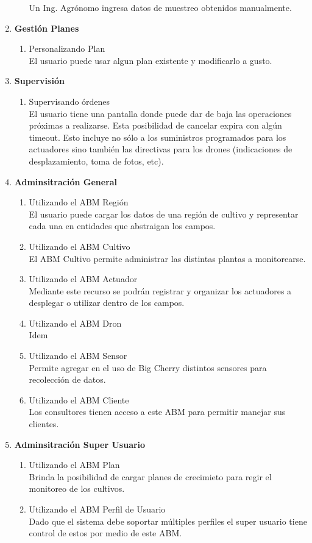\begin{enumerate}
\begin{enumerate}
   Un Ing. Agr\'onomo ingresa datos de muestreo obtenidos manualmente.
\end{enumerate}
 \item \textbf{Gesti\'on Planes}
 \begin{enumerate}
    \item Personalizando Plan\\
	El usuario puede usar algun plan existente y modificarlo a gusto.
 \end{enumerate}
 \item \textbf{Supervisión}
 \begin{enumerate}
  \item Supervisando órdenes\\
  El usuario tiene una pantalla donde puede dar de baja las operaciones próximas a realizarse. Esta posibilidad de cancelar expira con algún timeout. Esto incluye no sólo a los suministros programados para los actuadores sino también las directivas para los drones (indicaciones de desplazamiento, toma de fotos, etc).
 \end{enumerate} 
 \item \textbf{Adminsitraci\'on General}
 \begin{enumerate}
    \item Utilizando el ABM Región\\
	El usuario puede cargar los datos de una región de cultivo y representar cada una en entidades que abstraigan los campos.
    \item Utilizando el ABM Cultivo\\
	El ABM Cultivo permite administrar las distintas plantas a monitorearse.
    \item Utilizando el ABM Actuador\\
    Mediante este recurso se podrán registrar y organizar los actuadores a desplegar o utilizar dentro de los campos.
    \item Utilizando el ABM Dron\\
    Idem
    \item Utilizando el ABM Sensor\\
    Permite agregar en el uso de Big Cherry distintos sensores para recolección de datos.
    \item Utilizando el ABM Cliente\\
	Los consultores tienen acceso a este ABM para permitir manejar sus clientes.
 \end{enumerate}
 \item \textbf{Adminsitraci\'on Super Usuario}
 \begin{enumerate}
    \item Utilizando el ABM Plan\\
    Brinda la posibilidad de cargar planes de crecimieto para regir el monitoreo de los cultivos.
    \item Utilizando el ABM Perfil de Usuario\\
	Dado que el sistema debe soportar múltiples perfiles el super usuario tiene control de estos por medio de este ABM.
 \end{enumerate}
 

\end{enumerate}
